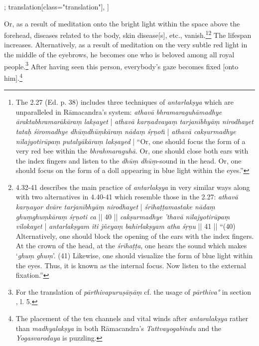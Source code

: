 \begin{alignment}[
  texts=edition[class="edition"];
  translation[class="translation"],
  ]
\begin{translation}
\begin{tlate}[p24_02]
      Or, as a result of meditation onto the bright light within the space above the forehead, diseases related to the body, skin disease[s], etc., vanish.\footnote{The  2.27 (Ed. p. 38) includes three techniques of \textit{antarlakṣya} which are unparalleled in Rāmacandra's system: \textit{athavā bhramaraguhāmadhye āraktabhramarākāraṃ lakṣayet} | \textit{athavā karṇadvayaṃ tarjanībhyāṃ nirodhayet tataḥ śiromadhye dhūṃdhūṃkāraṃ nādaṃ śṛṇot}i | \textit{athavā cakṣurmadhye nīlajyotirūpaṃ putalyākāraṃ lakṣayed} | ``Or, one should focus the form of a very red bee within the \textit{bhrahmaraguhā}. Or, one should close both ears with the index fingers and listen to the \textit{dhūṃ dhūṃ}-sound in the head. Or, one should focus on the form of a doll appearing in blue light within the eyes.''}\fnsep\footnote{ 4.32-41 describes the main practice of \textit{antarlakṣya} in very similar ways along with two alternatives in 4.40-41 which resemble those in the  2.27: \textit{athavā karṇayor dvāre tarjanībhyāṃ nirodhayet} | \textit{śrīhaṭṭamastake nādaṃ ghuṃghuṃkāraṃ śṛṇoti ca} || 40 || \textit{cakṣurmadhye 'thavā nīlajyotirūpaṃ vilokayet} | \textit{antarlakṣyam iti jñeyaṃ bahirlakṣyam atha śṛṇu} || 41 || ``(40) Alternatively, one should block the opening of the ears with the index fingers. At the crown of the head, at the \textit{śrīhaṭṭa}, one hears the sound which makes `\textit{ghuṃ ghuṃ}'. (41) Likewise, one should visualize the form of blue light within the eyes. Thus, it is known as the internal focus. Now listen to the external fixation.''} The lifespan increases. Alternatively, as a result of meditation on the very subtle red light in the middle of the eyebrows, he becomes one who is beloved among all royal people.\footnote{For the translation of \textit{pārthivapuruṣāṇāṃ} cf. the usage of \textit{pārthiva°} in section , l. 5.} After having seen this person, everybody's gaze becomes fixed [onto him].\footnote{The placement of the ten channels and vital winds after \textit{antaralakṣya} rather than \textit{madhyalakṣya} in both Rāmacandra's \emph{Tattvayogabindu} and the \emph{Yogasvarodaya} is puzzling.}
\flushpage 
\end{tlate}
  \end{translation}
\end{alignment}
\pagebreak %
